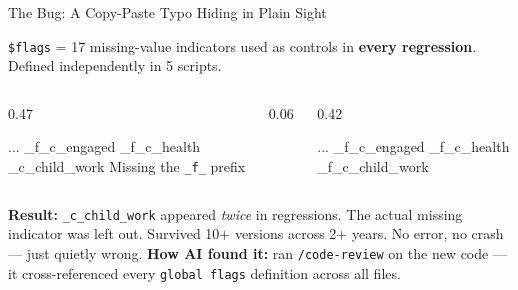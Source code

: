 \documentclass[aspectratio=169, 10pt]{beamer}
\begin{document}
\begin{frame}[fragile]{The Bug: A Copy-Paste Typo Hiding in Plain Sight}
\vskip-2pt
\begin{tcolorbox}[keybox, title={\faBug\quad The \texttt{\$flags} variable list}, top=2pt, bottom=2pt]
\small
\texttt{\$flags} = 17 missing-value indicators used as controls in \textbf{every regression}. Defined independently in 5 scripts.
\end{tcolorbox}
\vskip3pt
\begin{columns}[T]
\begin{column}{0.47\textwidth}
\begin{tcolorbox}[colback=SoftCoral!8, colframe=SoftCoral, boxrule=0.5pt, arc=2pt, left=5pt, right=5pt, top=3pt, bottom=3pt]
\vskip3pt
{\ttfamily\small\color{DeepCharcoal}
... \_f\_c\_engaged \_f\_c\_health\\
\colorbox{SoftCoral!20}{\_c\_child\_work}}
\vskip2pt
{\scriptsize Missing the \texttt{\_f\_} prefix}
\end{tcolorbox}
\end{column}
\begin{column}{0.06\textwidth}
\centering\vskip0.8cm
{\large\color{UVMGold}\faArrowRight}
\end{column}
\begin{column}{0.42\textwidth}
\begin{tcolorbox}[colback=PaleSage, colframe=SlateTeal!50, boxrule=0.5pt, arc=2pt, left=5pt, right=5pt, top=3pt, bottom=3pt]
\vskip3pt
{\ttfamily\small\color{DeepCharcoal}
... \_f\_c\_engaged \_f\_c\_health\\
\colorbox{PaleSage!50}{\_f\_c\_child\_work}}
\end{tcolorbox}
\end{column}
\end{columns}
\vskip3pt
\begin{tcolorbox}[quotebox, top=2pt, bottom=2pt]
\scriptsize \textbf{Result:} \texttt{\_c\_child\_work} appeared \textit{twice} in regressions. The actual missing indicator was left out. Survived 10+ versions across 2+ years. No error, no crash --- just quietly wrong.
\textbf{How AI found it:} ran \texttt{/code-review} on the new code --- it cross-referenced every \texttt{global flags} definition across all files.
\end{tcolorbox}
\end{frame}
\end{document}
